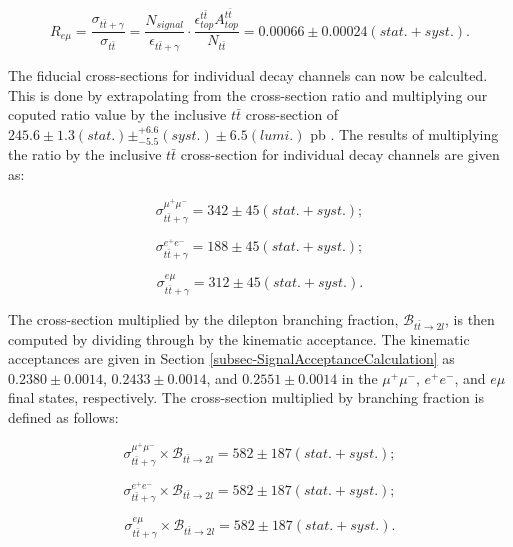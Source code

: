\begin{equation}
	R_{e\mu} = \frac{\sigma_{t\bar{t}+\gamma}}{\sigma_{t\bar{t}}} = \frac{N_{signal}}{\epsilon_{t\bar{t}+\gamma}} \cdot \frac{\epsilon^{t\bar{t}}_{top} A^{t\bar{t}}_{top}}{N_{t\bar{t}}} = 0.00066 \pm 0.00024 (stat. + syst.).
\end{equation}


 The fiducial cross-sections for individual decay channels can now be calculted. This is done by extrapolating from the cross-section ratio and multiplying our coputed ratio value by the inclusive $t\bar{t}$ cross-section of $245.6 \pm 1.3(stat.) \pm_{-5.5}^{+6.6}(syst.) \pm 6.5(lumi.)$ pb \cite{Khachatryan:2016mqs}. The results of multiplying the ratio by the inclusive $t\bar{t}$ cross-section for individual decay channels are given as:

\begin{equation}
	\sigma_{t\bar{t}+\gamma}^{\mu^+\mu^-} = 342 \pm 45 (stat. + syst.);
\end{equation}

\begin{equation}
	\sigma_{t\bar{t}+\gamma}^{e^+e^-} = 188 \pm 45 (stat. + syst.);
\end{equation}

\begin{equation}
	\sigma_{t\bar{t}+\gamma}^{e\mu} = 312 \pm 45 (stat. + syst.).
\end{equation}

 The cross-section multiplied by the dilepton branching fraction, $\mathcal{B}_{t\bar{t}\to2l}$, is then computed by dividing through by the kinematic acceptance. The kinematic acceptances are given in Section \ref{subsec-SignalAcceptanceCalculation} as $0.2380 \pm 0.0014$, $0.2433 \pm 0.0014$, and $0.2551 ± 0.0014$ in the $\mu^+\mu^-$, $e^+e^-$, and $e\mu$ final states, respectively. The cross-section multiplied by branching fraction is defined as follows:

\begin{equation}
	\sigma_{t\bar{t}+\gamma}^{\mu^+\mu^-}\times \mathcal{B}_{t\bar{t}\to2l} = 582 \pm 187 (stat. + syst.);
\end{equation}

\begin{equation}
	\sigma_{t\bar{t}+\gamma}^{e^+e^-}\times \mathcal{B}_{t\bar{t}\to2l}  = 582 \pm 187 (stat. + syst.);
\end{equation}

\begin{equation}
	\sigma_{t\bar{t}+\gamma}^{e\mu}\times \mathcal{B}_{t\bar{t}\to2l}  = 582 \pm 187 (stat. + syst.).
\end{equation}

